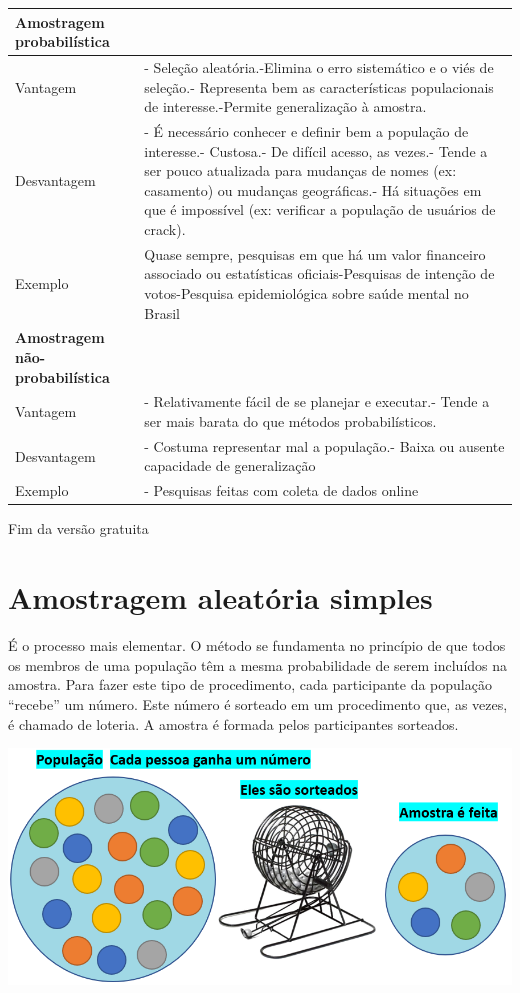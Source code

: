 \documentclass[
]{book}
\begin{document}
\begin{longtable}[]{@{}
  >{\raggedright\arraybackslash}p{}
  >{\raggedright\arraybackslash}p{}@{}}
\toprule
Amostragem probabilística & \\
\midrule
\endhead
Vantagem & - Seleção aleatória.-Elimina o erro sistemático e o viés de seleção.- Representa bem as características populacionais de interesse.-Permite generalização à amostra. \\
Desvantagem & - É necessário conhecer e definir bem a população de interesse.- Custosa.- De difícil acesso, as vezes.- Tende a ser pouco atualizada para mudanças de nomes (ex: casamento) ou mudanças geográficas.- Há situações em que é impossível (ex: verificar a população de usuários de crack). \\
Exemplo & Quase sempre, pesquisas em que há um valor financeiro associado ou estatísticas oficiais-Pesquisas de intenção de votos-Pesquisa epidemiológica sobre saúde mental no Brasil \\
\textbf{Amostragem não-probabilística} & \\
Vantagem & - Relativamente fácil de se planejar e executar.- Tende a ser mais barata do que métodos probabilísticos. \\
Desvantagem & - Costuma representar mal a população.- Baixa ou ausente capacidade de generalização \\
Exemplo & - Pesquisas feitas com coleta de dados online \\
\bottomrule
\end{longtable}

Fim da versão gratuita

\hypertarget{amostragem-aleatuxf3ria-simples}{%
\section{Amostragem aleatória simples}\label{amostragem-aleatuxf3ria-simples}}

É o processo mais elementar. O método se fundamenta no princípio de que todos os membros de uma população têm a mesma probabilidade de serem incluídos na amostra. Para fazer este tipo de procedimento, cada participante da população ``recebe'' um número. Este número é sorteado em um procedimento que, as vezes, é chamado de loteria. A amostra é formada pelos participantes sorteados.

\includegraphics{./img/cap_aas.png}
\end{document}
